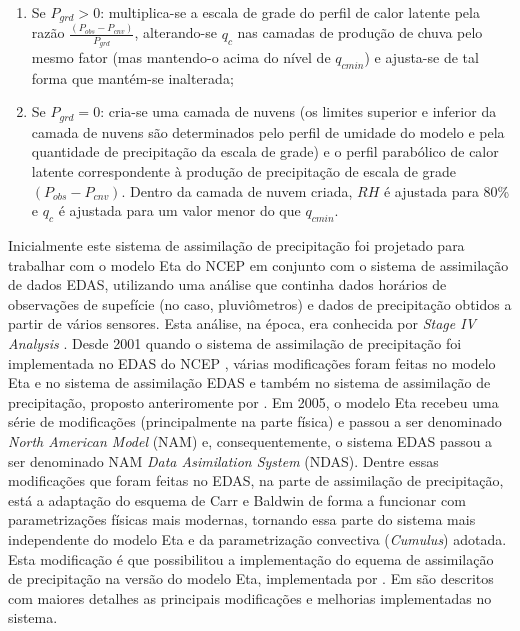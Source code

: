 \begin{enumerate}
\item Se $P_{grd}>0$: multiplica-se a escala de grade do perfil de calor latente pela razão $\frac{(P_{obs}-P_{cnv})}{P_{grd}}$, alterando-se $q_{c}$ nas camadas de produção de chuva pelo mesmo fator (mas mantendo-o acima do nível de $q_{cmin}$) e ajusta-se de tal forma que mantém-se inalterada;
\item Se $P_{grd}=0$: cria-se uma camada de nuvens (os limites superior e inferior da camada de nuvens são determinados pelo perfil de umidade do modelo e pela quantidade de precipitação da escala de grade) e o perfil parabólico de calor latente correspondente à produção de precipitação de escala de grade $(P_{obs}-P_{cnv})$. Dentro da camada de nuvem criada, $RH$ é ajustada para 80\% e $q_{c}$ é ajustada para um valor menor do que $q_{cmin}$.
\end{enumerate}

Inicialmente este sistema de assimilação de precipitação foi projetado para trabalhar com o modelo Eta do NCEP em conjunto com o sistema de assimilação de dados EDAS, utilizando uma análise que continha dados horários de observações de supefície (no caso, pluviômetros) e dados de precipitação obtidos a partir de vários sensores. Esta análise, na época, era conhecida por \textit{Stage IV Analysis} \cite{linetal01}. Desde 2001 quando o sistema de assimilação de precipitação foi implementada no EDAS do NCEP \cite{rogersetal01}, várias modificações foram feitas no modelo Eta e no sistema de assimilação EDAS e também no sistema de assimilação de precipitação, proposto anteriromente por . Em 2005, o modelo Eta recebeu uma série de modificações (principalmente na parte física) e passou a ser denominado \textit{North American Model} (NAM) e, consequentemente, o sistema EDAS passou a ser denominado NAM \textit{Data Asimilation System} (NDAS). Dentre essas modificações que foram feitas no EDAS, na parte de assimilação de precipitação, está a adaptação do esquema de Carr e Baldwin de forma a funcionar com parametrizações físicas mais modernas, tornando essa parte do sistema mais independente do modelo Eta e da parametrização convectiva (\textit{Cumulus}) adotada. Esta modificação é que possibilitou a implementação do equema de assimilação de precipitação na versão do modelo Eta, implementada por . Em  são descritos com maiores detalhes as principais modificações e melhorias implementadas no sistema.

